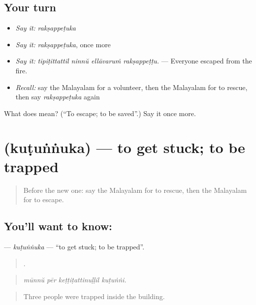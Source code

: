 \subsection*{Your turn}
\begin{itemize}
\raggedright
  \item \emph{Say it:} \emph{rakṣappeṭuka}
  \item \emph{Say it:} \emph{rakṣappeṭuka}, once more
  \item \emph{Say it:} \emph{tīpiṭittattil ninnŭ ellāvaruṁ rakṣappeṭṭu.} — Everyone escaped from the fire.
  \item \emph{Recall:} say the Malayalam for a volunteer, then the Malayalam for to rescue, then say \emph{rakṣappeṭuka} again
\end{itemize}

\begin{tcolorbox}[breakable,colback=teal!4,colframe=teal!35!black,title={Before you move on}]
What does  mean? (\textquotedblleft{}To escape; to be saved\textquotedblright{}.) Say it once more.
\end{tcolorbox}
\section[\texorpdfstring{\ml{കുടുങ്ങുക} (kuṭuṅṅuka)}{കുടുങ്ങുക (kuṭuṅṅuka)}]{ (kuṭuṅṅuka) — to get stuck; to be trapped}

\label{lesson:ML-C375-kutunnuka}



\begin{quote}
Before the new one: say the Malayalam for to rescue, then the Malayalam for to escape.
\end{quote}

\subsection*{You'll want to know: }
\textbf{} — \emph{kuṭuṅṅuka} — \textquotedblleft{}to get stuck; to be trapped\textquotedblright{}.

\begin{quote}
   .
\end{quote}

\begin{quote}
\emph{mūnnŭ pēr keṭṭiṭattinuḷḷil kuṭuṅṅi.}
\end{quote}

\begin{quote}
Three people were trapped inside the building.
\end{quote}


